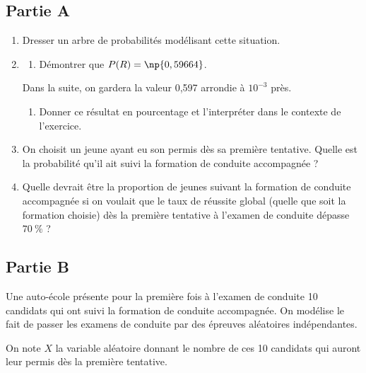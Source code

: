 	\subsection*{Partie A}
		\begin{enumerate}
			\item Dresser un arbre de probabilités modélisant cette situation.
			\item \begin{enumerate}
				\item Démontrer que $P(R)= \np{0,59664}$.
			\end{enumerate}

			Dans la suite, on gardera la valeur 0,597 arrondie à $10^{-3}$ près.

			\begin{enumerate}[resume]
				\item Donner ce résultat en pourcentage et l'interpréter dans le contexte de l'exercice.
			\end{enumerate}

			\item On choisit un jeune ayant eu son permis dès sa première tentative. Quelle est la probabilité qu'il ait suivi la formation de conduite accompagnée ?

			\item Quelle devrait être la proportion de jeunes suivant la formation de conduite accompagnée si on voulait que le taux de réussite global (quelle que soit la formation choisie) dès la première tentative à l'examen de conduite dépasse $70~\%$ ?
		\end{enumerate}

	\subsection*{Partie B}
		Une auto-école présente pour la première fois à l'examen de conduite 10 candidats qui ont suivi la formation de conduite accompagnée. On modélise le fait de passer les examens de conduite par des épreuves aléatoires indépendantes.

		\medskip

		On note $X$ la variable aléatoire donnant le nombre de ces 10 candidats qui auront leur permis dès la première tentative.


